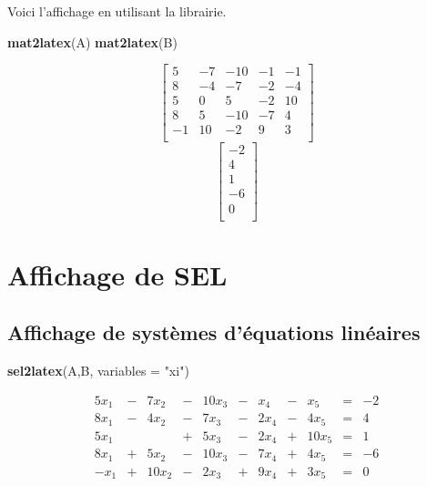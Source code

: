 \documentclass[]{article}
\newenvironment{Shaded}{\begin{snugshade}}{\end{snugshade}}
\newcommand{\DataTypeTok}[1]{\textcolor[rgb]{0.13,0.29,0.53}{#1}}
\newcommand{\KeywordTok}[1]{\textcolor[rgb]{0.13,0.29,0.53}{\textbf{#1}}}
\newcommand{\NormalTok}[1]{#1}
\newcommand{\StringTok}[1]{\textcolor[rgb]{0.31,0.60,0.02}{#1}}
\begin{document}
Voici l'affichage en utilisant la librairie.

\begin{Shaded}
\begin{Highlighting}[]
\KeywordTok{mat2latex}\NormalTok{(A)}
\KeywordTok{mat2latex}\NormalTok{(B)}
\end{Highlighting}
\end{Shaded}

\[
\left[
\begin{array}{rrrrr}
5 & -7 & -10 & -1 & -1 \\ 
8 & -4 & -7 & -2 & -4 \\ 
5 & 0 & 5 & -2 & 10 \\ 
8 & 5 & -10 & -7 & 4 \\ 
-1 & 10 & -2 & 9 & 3 \\ 
\end{array}
\right]
\]\[
\left[
\begin{array}{r}
-2 \\ 
4 \\ 
1 \\ 
-6 \\ 
0 \\ 
\end{array}
\right]
\]

\hypertarget{affichage-de-sel}{%
\section{Affichage de SEL}\label{affichage-de-sel}}

\hypertarget{affichage-de-systemes-dequations-lineaires}{%
\subsection{Affichage de systèmes d'équations
linéaires}\label{affichage-de-systemes-dequations-lineaires}}

\begin{Shaded}
\begin{Highlighting}[]
\KeywordTok{sel2latex}\NormalTok{(A,B, }\DataTypeTok{variables =} \StringTok{"xi"}\NormalTok{)}
\end{Highlighting}
\end{Shaded}

\[
\begin{array}{rrrrrrrrrrr}
5 x_{1} & - & 7 x_{2} & - & 10 x_{3} & - & x_{4} & - & x_{5} & = & -2 \\ 
8 x_{1} & - & 4 x_{2} & - & 7 x_{3} & - & 2 x_{4} & - & 4 x_{5} & = & 4 \\ 
5 x_{1} & & & + & 5 x_{3} & - & 2 x_{4} & + & 10 x_{5} & = & 1 \\ 
8 x_{1} & + & 5 x_{2} & - & 10 x_{3} & - & 7 x_{4} & + & 4 x_{5} & = & -6 \\ 
-x_{1} & + & 10 x_{2} & - & 2 x_{3} & + & 9 x_{4} & + & 3 x_{5} & = & 0 \\ 
\end{array}
\]
\end{document}
